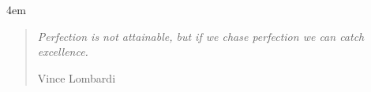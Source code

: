 \clearpage
\thispagestyle{empty}
\vspace*{\fill}
{
    \advance\leftmargini 4em
    \begin{quote}
        {\em Perfection is not attainable, 
        but if we chase perfection we can 
        catch excellence.}

        \medskip
        \raggedleft
        Vince Lombardi
    \end{quote}
}
\vspace*{\fill}
